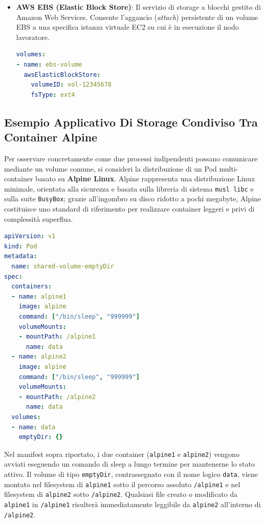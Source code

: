 \documentclass[11pt, a4paper]{article}
\begin{document}
\begin{itemize}[noitemsep]
    \item \textbf{AWS EBS (Elastic Block Store)}: Il servizio di storage a blocchi gestito di Amazon Web Services. Consente l'aggancio (\emph{attach}) persistente di un volume EBS a una specifica istanza virtuale EC2 su cui è in esecuzione il nodo lavoratore.
    \begin{lstlisting}[language=yaml, caption={Dichiarazione di un volume di tipo \texttt{awsElasticBlockStore}.}]
volumes:
- name: ebs-volume
  awsElasticBlockStore:
    volumeID: vol-12345678
    fsType: ext4
    \end{lstlisting}
\end{itemize}

\subsection{Esempio Applicativo Di Storage Condiviso Tra Container Alpine}
Per osservare concretamente come due processi indipendenti possano comunicare mediante un volume comune, si consideri la distribuzione di un Pod multi-container basato su \textbf{Alpine Linux}. Alpine rappresenta una distribuzione Linux minimale, orientata alla sicurezza e basata sulla libreria di sistema \texttt{musl libc} e sulla suite \texttt{BusyBox}; grazie all'ingombro su disco ridotto a pochi megabyte, Alpine costituisce uno standard di riferimento per realizzare container leggeri e privi di complessità superflua.

\begin{lstlisting}[language=yaml, caption={Manifest di condivisione di un volume \texttt{emptyDir} (\texttt{shared-volume-emptydir.yml}).}]
apiVersion: v1
kind: Pod
metadata:
  name: shared-volume-emptyDir
spec:
  containers:
  - name: alpine1
    image: alpine
    command: ["/bin/sleep", "999999"]
    volumeMounts:
    - mountPath: /alpine1
      name: data
  - name: alpine2
    image: alpine
    command: ["/bin/sleep", "999999"]
    volumeMounts:
    - mountPath: /alpine2
      name: data
  volumes:
  - name: data
    emptyDir: {}
\end{lstlisting}

Nel manifest sopra riportato, i due container (\texttt{alpine1} e \texttt{alpine2}) vengono avviati eseguendo un comando di sleep a lungo termine per mantenerne lo stato attivo. Il volume di tipo \texttt{emptyDir}, contrassegnato con il nome logico \texttt{data}, viene montato nel filesystem di \texttt{alpine1} sotto il percorso assoluto \texttt{/alpine1} e nel filesystem di \texttt{alpine2} sotto \texttt{/alpine2}. Qualsiasi file creato o modificato da \texttt{alpine1} in \texttt{/alpine1} risulterà immediatamente leggibile da \texttt{alpine2} all'interno di \texttt{/alpine2}.
\end{document}
